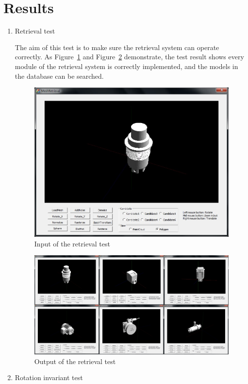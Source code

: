 \section{Results} \label{sec:results}

\begin{enumerate}
\item Retrieval test

The aim of this test is to make sure the retrieval system can operate correctly. As Figure~\ref{input_retrievaltest} and Figure~\ref{output_retrievaltest} demonstrate, the test result shows every module of the retrieval system is correctly implemented, and the models in the database can be searched. 

\begin{figure}[h]
\centering
\includegraphics[width=0.7\linewidth]{input_initialdesign}
\caption{Input of the retrieval test} \label{input_retrievaltest}
\end{figure}

\begin{figure}[h]
\centering
\includegraphics[width=0.7\linewidth]{output_finaldesign}
\caption{Output of the retrieval test} \label{output_retrievaltest}
\end{figure}

\item Rotation invariant test


\end{enumerate}
